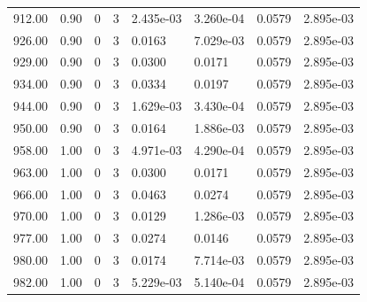\documentclass[preview]{standalone}
\begin{document}
{{{{{{{\begin{tabular}{L{1.2cm}C{1.2cm} C{0.3cm}C{0.5cm} C{1.4cm}C{1.4cm} C{1.4cm}C{1.4cm}}
  912.00  &  0.90  & 0     &  3 &  2.435e-03  & 3.260e-04  & 0.0579 &  2.895e-03   \\ 
  926.00  &  0.90  & 0     &  3 &  0.0163  & 7.029e-03  & 0.0579 &  2.895e-03   \\ 
  929.00  &  0.90  & 0     &  3 &  0.0300  & 0.0171  & 0.0579 &  2.895e-03   \\ 
  934.00  &  0.90  & 0     &  3 &  0.0334  & 0.0197  & 0.0579 &  2.895e-03   \\ 
  944.00  &  0.90  & 0     &  3 &  1.629e-03  & 3.430e-04  & 0.0579 &  2.895e-03   \\ 
  950.00  &  0.90  & 0     &  3 &  0.0164  & 1.886e-03  & 0.0579 &  2.895e-03   \\ 
  958.00  &  1.00  & 0     &  3 &  4.971e-03  & 4.290e-04  & 0.0579 &  2.895e-03   \\ 
  963.00  &  1.00  & 0     &  3 &  0.0300  & 0.0171  & 0.0579 &  2.895e-03   \\ 
  966.00  &  1.00  & 0     &  3 &  0.0463  & 0.0274  & 0.0579 &  2.895e-03   \\ 
  970.00  &  1.00  & 0     &  3 &  0.0129  & 1.286e-03  & 0.0579 &  2.895e-03   \\ 
  977.00  &  1.00  & 0     &  3 &  0.0274  & 0.0146  & 0.0579 &  2.895e-03   \\ 
  980.00  &  1.00  & 0     &  3 &  0.0174  & 7.714e-03  & 0.0579 &  2.895e-03   \\ 
  982.00  &  1.00  & 0     &  3 &  5.229e-03  & 5.140e-04  & 0.0579 &  2.895e-03   \\ 
\hline 
\end{tabular} 

}}}}}}}
\end{document}
